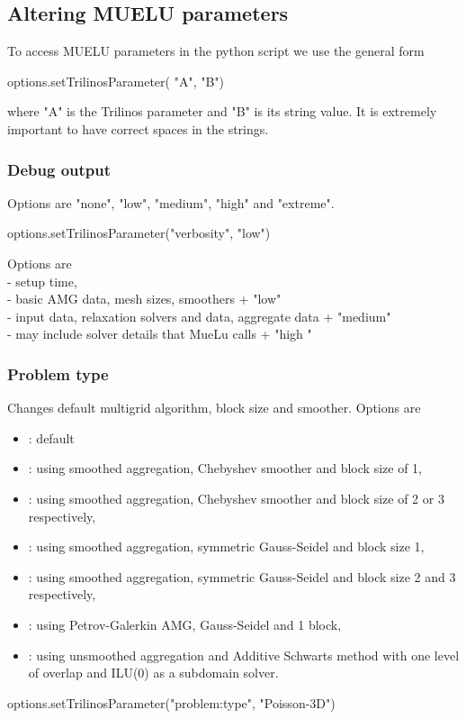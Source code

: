 \subsection{Altering MUELU parameters}
To access MUELU parameters in the python script we use the general form  
\begin{python}
options.setTrilinosParameter( "A", "B")        
\end{python}
where "A" is the Trilinos parameter and "B" is its string value. It is extremely important to have correct spaces in the strings.  

\subsubsection{Debug output}
Options are "none", "low", "medium", "high" and "extreme".
\begin{python}
options.setTrilinosParameter("verbosity", "low")  
\end{python}
Options are\\
 - setup time,\\
 - basic AMG data, mesh sizes, smoothers + "low" \\
 - input data, relaxation solvers and data, aggregate data + "medium"\\
 - may include solver details that MueLu calls + "high "\\

\subsubsection{Problem type}
Changes default multigrid algorithm, block size and smoother.  
Options are 
\begin{itemize}
    \item {}: default
    \item {} : using smoothed aggregation, Chebyshev smoother and block size of 1,
    \item {}: using smoothed aggregation, Chebyshev smoother and block size of 2 or 3 respectively,
    \item {}: using smoothed aggregation, symmetric Gauss-Seidel and block size 1,
    \item {}: using smoothed aggregation, symmetric Gauss-Seidel and block size 2 and 3 respectively,
    \item {}: using Petrov-Galerkin AMG, Gauss-Seidel and 1 block,
    \item {}: using unsmoothed aggregation and Additive Schwarts method with one level of overlap and ILU(0) as a subdomain solver.
\end{itemize}
\begin{python}
options.setTrilinosParameter("problem:type", "Poisson-3D")    
\end{python}

